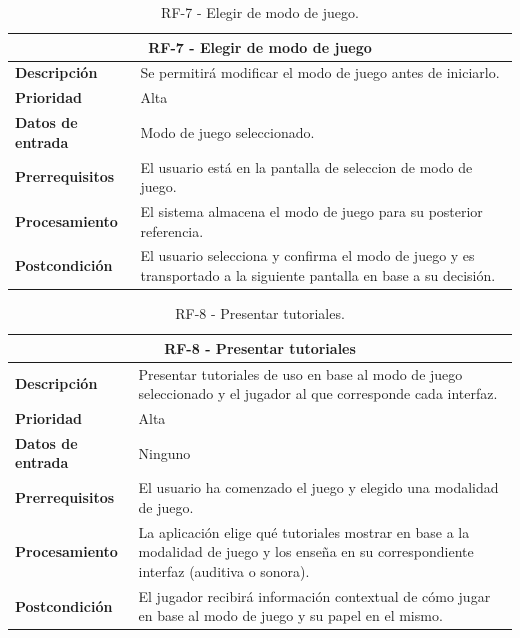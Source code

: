 \begin{table}[H]
	\centering
	\caption{RF-7 -  Elegir de modo de juego.}
	\label{table:RF7}
	\begin{tabular}{|l|p{10cm}|}
		\hline
		\multicolumn{2}{|c|}{\textbf{RF-7 -  Elegir de modo de juego}} \\
		\hline
		\textbf{Descripción} & Se permitirá modificar el modo de juego antes de iniciarlo.  \\
		\hline
		\textbf{Prioridad} & Alta \\
		\hline
		\textbf{Datos de entrada} & Modo de juego seleccionado. \\
		\hline
		\textbf{Prerrequisitos} & El usuario está en la pantalla de seleccion de modo de juego. \\
		\hline
		\textbf{Procesamiento} & El sistema almacena el modo de juego para su posterior referencia. \\
		\hline
		\textbf{Postcondición} & El usuario selecciona y confirma el modo de juego y es transportado a la siguiente pantalla en base a su decisión. \\
		\hline
	\end{tabular}
	
\end{table}
\begin{table}[H]
	\centering
	\caption{RF-8 - Presentar tutoriales.}
	\label{table:RF8}
	\begin{tabular}{|l|p{10cm}|}
		\hline
		\multicolumn{2}{|c|}{\textbf{RF-8 - Presentar tutoriales}} \\
		\hline
		\textbf{Descripción} & Presentar tutoriales de uso en base al modo de juego seleccionado y el jugador al que corresponde cada interfaz. \\
		\hline
		\textbf{Prioridad} & Alta \\
		\hline
		\textbf{Datos de entrada} & Ninguno \\
		\hline
		\textbf{Prerrequisitos} & El usuario ha comenzado el juego y elegido una modalidad de juego. \\
		\hline
		\textbf{Procesamiento} & La aplicación elige qué tutoriales mostrar en base a la modalidad de juego y los enseña en su correspondiente interfaz (auditiva o sonora). \\
		\hline
		\textbf{Postcondición} & El jugador recibirá información contextual de cómo jugar en base al modo de juego y su papel en el mismo. \\
		\hline
	\end{tabular}
	
\end{table}
